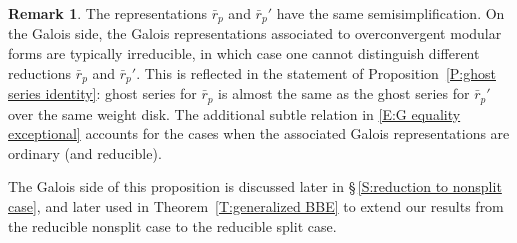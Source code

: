 \documentclass[12pt]{amsart}
\theoremstyle{definition}
\newtheorem{remark}[subsection]{Remark}
\numberwithin{equation}{subsection}
\begin{document}
\begin{remark}
The representations $\bar r_p$ and $\bar r_p'$ have the same semisimplification.  On the Galois side, the Galois representations associated to overconvergent modular forms are typically irreducible, in which case one cannot distinguish different reductions $\bar r_p$ and $\bar r_p'$. This is reflected in the statement of Proposition~\ref{P:ghost series identity}: ghost series for $\bar r_p$ is almost the same as the ghost series for $\bar r_p'$ over the same weight disk.
The additional subtle relation in \eqref{E:G equality exceptional} accounts for the cases when the associated Galois representations are ordinary (and reducible). 

The Galois side of this proposition is discussed later in \S\,\ref{S:reduction to nonsplit case}, and later used in Theorem~\ref{T:generalized BBE} to extend our results from the reducible nonsplit case to the reducible split case.
\end{remark}
\end{document}
